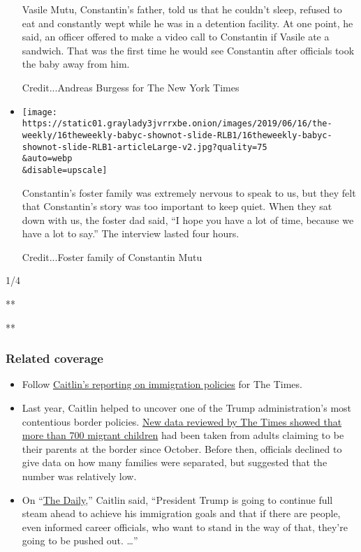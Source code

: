 \begin{itemize}
  Vasile Mutu, Constantin's father, told us that he couldn't sleep,
  refused to eat and constantly wept while he was in a detention
  facility. At one point, he said, an officer offered to make a video
  call to Constantin if Vasile ate a sandwich. That was the first time
  he would see Constantin after officials took the baby away from him.

  Credit...Andreas Burgess for The New York Times
\item
  \texttt{[image: https://static01.graylady3jvrrxbe.onion/images/2019/06/16/the-weekly/16theweekly-babyc-shownot-slide-RLB1/16theweekly-babyc-shownot-slide-RLB1-articleLarge-v2.jpg?quality=75\\\&auto=webp\\\&disable=upscale]}

  Constantin's foster family was extremely nervous to speak to us, but
  they felt that Constantin's story was too important to keep quiet.
  When they sat down with us, the foster dad said, ``I hope you have a
  lot of time, because we have a lot to say.'' The interview lasted four
  hours.~

  Credit...Foster family of Constantin Mutu
\end{itemize}

1/4

**

**

\hypertarget{related-coverage}{%
\subsubsection{Related coverage}\label{related-coverage}}

\begin{itemize}
\item
  Follow
  \href{https://www.nytimes3xbfgragh.onion/by/caitlin-dickerson}{Caitlin's
  reporting on immigration policies} for The Times.
\item
  Last year, Caitlin helped to uncover one of the Trump administration's
  most contentious border policies.
  \href{https://www.nytimes3xbfgragh.onion/2018/04/20/us/immigrant-children-separation-ice.html}{New
  data reviewed by The Times showed that more than 700 migrant children}
  had been taken from adults claiming to be their parents at the border
  since October. Before then, officials declined to give data on how
  many families were separated, but suggested that the number was
  relatively low.
\item
  On
  ``\href{https://www.nytimes3xbfgragh.onion/2019/04/09/podcasts/the-daily/kirstjen-nielsen-resigns-immigration-border.html}{The
  Daily},'' Caitlin said, ``President Trump is going to continue full
  steam ahead to achieve his immigration goals and that if there are
  people, even informed career officials, who want to stand in the way
  of that, they're going to be pushed out. \ldots{}''
\end{itemize}

